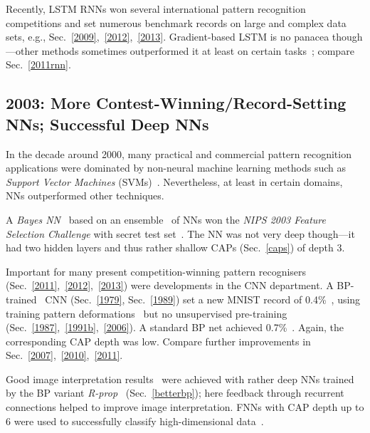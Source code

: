\documentclass[letterpaper]{article}
\begin{document}
\begin{sloppypar}
Recently, LSTM RNNs won several international pattern recognition competitions 
and set numerous benchmark records 
on large and complex data sets, e.g., 
Sec.~\ref{2009},~\ref{2012},~\ref{2013}.
Gradient-based LSTM is no panacea though---other methods sometimes outperformed  
it at least on certain tasks~\citep{Jaeger:04,Schmidhuber:07nc,Martens:2011hessfree,pascanu2013,icml2014}; compare Sec.~\ref{2011rnn}.





\subsection{2003: More Contest-Winning/Record-Setting NNs; Successful Deep NNs}
\label{2003}

In the decade around 2000, many practical and commercial
pattern recognition applications were dominated by non-neural
machine learning methods
such as {\em Support Vector Machines} (SVMs)~\citep{Vapnik:95,advkernel}.
Nevertheless, at least in certain domains, NNs 
outperformed other techniques.


A  {\em Bayes NN}~\citep{neal2006b} based on an ensemble~\citep{breiman:1996,Schapire:90,wolpert:92stacked,hashem:1992,Ueda2000,dietterich2000} of NNs won 
the  {\em NIPS 2003 Feature Selection Challenge}
with secret test set~\citep{neal2006}.
The NN was not very deep though---it had two hidden layers
and thus rather shallow CAPs (Sec.~\ref{caps}) of depth 3.

Important for many present competition-winning pattern recognisers  (Sec.~\ref{2011},~\ref{2012},~\ref{2013})
were developments in the CNN department.
A BP-trained~\citep{LeCun:89} CNN (Sec.~\ref{1979}, Sec.~\ref{1989}) 
set a new MNIST record of 0.4\%~\citep{simard:2003},
using training pattern
deformations~\citep{Baird90} but no unsupervised pre-training (Sec.~\ref{1987},~\ref{1991b},~\ref{2006}).
A standard BP net achieved 0.7\%~\citep{simard:2003}.
Again, the corresponding CAP depth was low. 
Compare further improvements in Sec.~\ref{2007},~\ref{2010},~\ref{2011}.



Good image interpretation results~\citep{Behnke:LNCS} were achieved with rather deep NNs trained by the 
BP variant {\em R-prop}~\citep{rprop93} (Sec.~\ref{betterbp});
here feedback through recurrent connections helped to improve image interpretation. 
FNNs with CAP depth up to 6 were used to successfully classify high-dimensional data~\citep{vieira2003}. 


\end{sloppypar}
\end{document}
